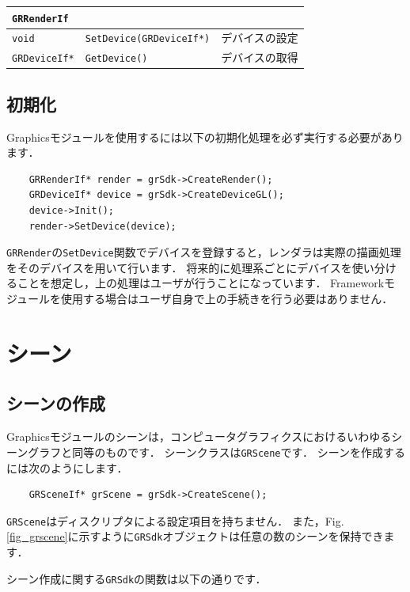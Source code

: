 \begin{center}
\begin{tabular}{p{.2\hsize}p{.40\hsize}p{.3\hsize}}
\texttt{GRRenderIf}		&									&	\\ \midrule
\texttt{void}			& \texttt{SetDevice(GRDeviceIf*)}	& デバイスの設定	\\
\texttt{GRDeviceIf*} 	& \texttt{GetDevice()}				& デバイスの取得	\\
\end{tabular}
\end{center}

\subsection*{初期化}

Graphicsモジュールを使用するには以下の初期化処理を必ず実行する必要があります．
\begin{verbatim}
   	GRRenderIf* render = grSdk->CreateRender();
    GRDeviceIf* device = grSdk->CreateDeviceGL();
    device->Init();
    render->SetDevice(device);
\end{verbatim}
\texttt{GRRender}の\texttt{SetDevice}関数でデバイスを登録すると，レンダラは実際の描画処理をそのデバイスを用いて行います．
\KLUDGE 将来的に処理系ごとにデバイスを使い分けることを想定し，上の処理はユーザが行うことになっています．
Frameworkモジュールを使用する場合はユーザ自身で上の手続きを行う必要はありません．

\section{シーン}
\label{sec_grscene}

\subsection*{シーンの作成}

Graphicsモジュールのシーンは，コンピュータグラフィクスにおけるいわゆるシーングラフと同等のものです．
\KLUDGE シーンクラスは\texttt{GRScene}です．
\KLUDGE シーンを作成するには次のようにします．
\begin{verbatim}
    GRSceneIf* grScene = grSdk->CreateScene();
\end{verbatim}
\texttt{GRScene}はディスクリプタによる設定項目を持ちません．
\KLUDGE また，Fig.\,\ref{fig_grscene}に示すように\texttt{GRSdk}オブジェクトは任意の数のシーンを保持できます．

\KLUDGE シーン作成に関する\texttt{GRSdk}の関数は以下の通りです．

